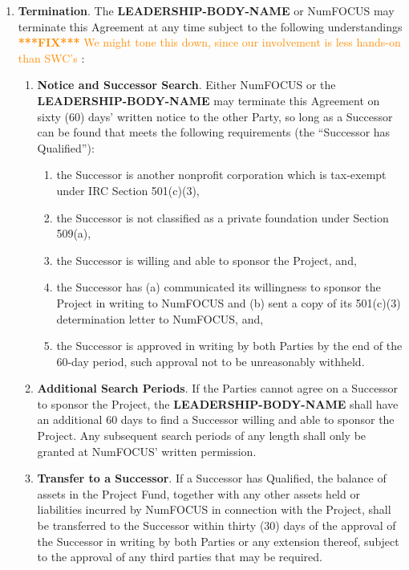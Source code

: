 \documentclass[letterpaper,12pt]{article}
\newcommand{\fix}[1]{
  \textcolor{darkorange} { \textbf{***FIX***} #1 } }
\newcommand{\leadershipbody}{\textbf{LEADERSHIP-BODY-NAME}}
\begin{document}
\begin{enumerate}[label=\arabic*.,ref=\S~\arabic*]
\item \textbf{Termination}. \label{Termination} The \leadershipbody{} or
  NumFOCUS may terminate this Agreement at any time subject to the following
  understandings \fix{We might tone this down, since our involvement is less
    hands-on than SWC's}:

\begin{enumerate}[label=\alph*.,ref=\theenumi(\arabic*)]

\item \textbf{Notice and Successor Search}. Either NumFOCUS or the
  \leadershipbody{} may terminate this Agreement on sixty (60) days' written
  notice to the other Party, so long as a Successor can be found that meets the
  following requirements (the ``Successor has Qualified''):


\begin{enumerate}[label=\roman*.,ref=\theenumi(\alph{enumii})(\roman*)]
  
\item the Successor is another nonprofit corporation which is tax-exempt under
  IRC Section 501(c)(3),
  
\item the Successor is not classified as a private foundation under Section
  509(a),
  
\item the Successor is willing and able to sponsor the Project, and,
  
\item the Successor has (a) communicated its willingness to sponsor the Project
  in writing to NumFOCUS and (b) sent a copy of its 501(c)(3) determination
  letter to NumFOCUS, and,
  
\item the Successor is approved in writing by both Parties by the end of the
  60-day period, such approval not to be unreasonably withheld.
  
\end{enumerate}

\item \textbf{Additional Search Periods}. If the Parties cannot agree on a
  Successor to sponsor the Project, the \leadershipbody{} shall have an
  additional 60 days to find a Successor willing and able to sponsor the
  Project. Any subsequent search periods of any length shall only be granted at
  NumFOCUS' written permission.

\item \textbf{Transfer to a Successor}. If a Successor has Qualified, the
  balance of assets in the Project Fund, together with any other assets held or
  liabilities incurred by NumFOCUS in connection with the Project, shall be
  transferred to the Successor within thirty (30) days of the approval of the
  Successor in writing by both Parties or any extension thereof, subject to the
  approval of any third parties that may be required.


\end{enumerate}
\end{enumerate}
\end{document}
